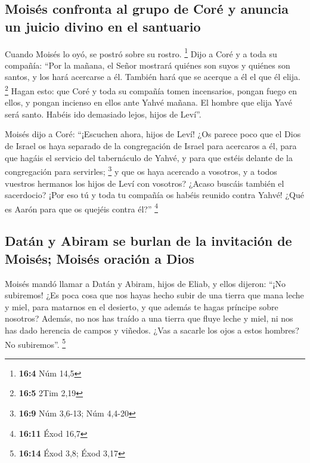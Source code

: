 \begin{paracol}{2}
\hypertarget{moisuxe9s-confronta-al-grupo-de-coruxe9-y-anuncia-un-juicio-divino-en-el-santuario}{%
\subsection{Moisés confronta al grupo de Coré y anuncia un juicio divino
en el
santuario}\label{moisuxe9s-confronta-al-grupo-de-coruxe9-y-anuncia-un-juicio-divino-en-el-santuario}}

 Cuando Moisés lo oyó, se postró sobre su rostro.
\footnote{\textbf{16:4} Núm 14,5}  Dijo a Coré y a toda su
compañía: ``Por la mañana, el Señor mostrará quiénes son suyos y quiénes
son santos, y los hará acercarse a él. También hará que se acerque a él
el que él elija. \footnote{\textbf{16:5} 2Tim 2,19}  Hagan
esto: que Coré y toda su compañía tomen incensarios, 
pongan fuego en ellos, y pongan incienso en ellos ante Yahvé mañana. El
hombre que elija Yavé será santo. Habéis ido demasiado lejos, hijos de
Leví''.

 Moisés dijo a Coré: ``¡Escuchen ahora, hijos de Leví!
 ¿Os parece poco que el Dios de Israel os haya separado de
la congregación de Israel para acercaros a él, para que hagáis el
servicio del tabernáculo de Yahvé, y para que estéis delante de la
congregación para servirles; \footnote{\textbf{16:9} Núm 3,6-13; Núm
  4,4-20}  y que os haya acercado a vosotros, y a todos
vuestros hermanos los hijos de Leví con vosotros? ¿Acaso buscáis también
el sacerdocio?  ¡Por eso tú y toda tu compañía os habéis
reunido contra Yahvé! ¿Qué es Aarón para que os quejéis contra él?''
\footnote{\textbf{16:11} Éxod 16,7}

\hypertarget{datuxe1n-y-abiram-se-burlan-de-la-invitaciuxf3n-de-moisuxe9s-moisuxe9s-oraciuxf3n-a-dios}{%
\subsection{Datán y Abiram se burlan de la invitación de Moisés; Moisés
oración a
Dios}\label{datuxe1n-y-abiram-se-burlan-de-la-invitaciuxf3n-de-moisuxe9s-moisuxe9s-oraciuxf3n-a-dios}}

 Moisés mandó llamar a Datán y Abiram, hijos de Eliab, y
ellos dijeron: ``¡No subiremos!  ¿Es poca cosa que nos
hayas hecho subir de una tierra que mana leche y miel, para matarnos en
el desierto, y que además te hagas príncipe sobre nosotros?
 Además, no nos has traído a una tierra que fluye leche y
miel, ni nos has dado herencia de campos y viñedos. ¿Vas a sacarle los
ojos a estos hombres? No subiremos''. \footnote{\textbf{16:14} Éxod 3,8;
  Éxod 3,17}


\end{paracol}
